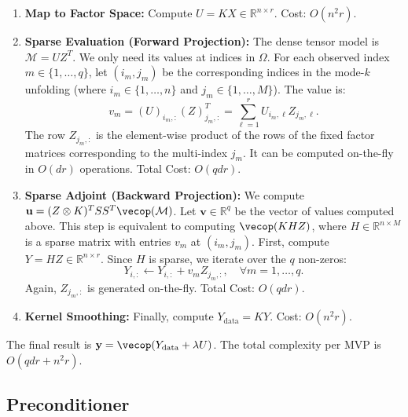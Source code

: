 \documentclass[11pt]{article}
\begin{document}
\begin{enumerate}
    \item \textbf{Map to Factor Space:} Compute $U = K X \in \mathbb{R}^{n \times r}$. 
    Cost: $O(n^2 r)$.
    
    \item \textbf{Sparse Evaluation (Forward Projection):} The dense tensor model is $\mathcal{M} = U Z^T$. We only need its values at indices in $\Omega$. For each observed index $m \in \{1, \dots, q\}$, let $(i_m, j_m)$ be the corresponding indices in the mode-$k$ unfolding (where $i_m \in \{1,\dots,n\}$ and $j_m \in \{1,\dots,M\}$).
    The value is:
    \begin{equation}
        v_m = (U)_{i_m, :} (Z)_{j_m, :}^T = \sum_{\ell=1}^r U_{i_m, \ell} Z_{j_m, \ell}.
    \end{equation}
    The row $Z_{j_m, :}$ is the element-wise product of the rows of the fixed factor matrices corresponding to the multi-index $j_m$. It can be computed on-the-fly in $O(dr)$ operations.
    Total Cost: $O(qdr)$.
    
    \item \textbf{Sparse Adjoint (Backward Projection):} We compute $\mathbf{u} = (Z \otimes K)^T S S^T \vecop(\mathcal{M})$. Let $\mathbf{v} \in \mathbb{R}^q$ be the vector of values computed above. This step is equivalent to computing $\vecop(K H Z)$, where $H \in \mathbb{R}^{n \times M}$ is a sparse matrix with entries $v_m$ at $(i_m, j_m)$.
    First, compute $Y = H Z \in \mathbb{R}^{n \times r}$. Since $H$ is sparse, we iterate over the $q$ non-zeros:
    \begin{equation}
        Y_{i, :} \leftarrow Y_{i, :} + v_m Z_{j_m, :}, \quad \forall m=1,\dots,q.
    \end{equation}
    Again, $Z_{j_m, :}$ is generated on-the-fly.
    Total Cost: $O(qdr)$.
    
    \item \textbf{Kernel Smoothing:} Finally, compute $Y_{\text{data}} = K Y$. 
    Cost: $O(n^2 r)$.
\end{enumerate}

The final result is $\mathbf{y} = \vecop(Y_{\text{data}} + \lambda U)$. The total complexity per MVP is $O(qdr + n^2 r)$.

\subsection{Preconditioner}
\end{document}
